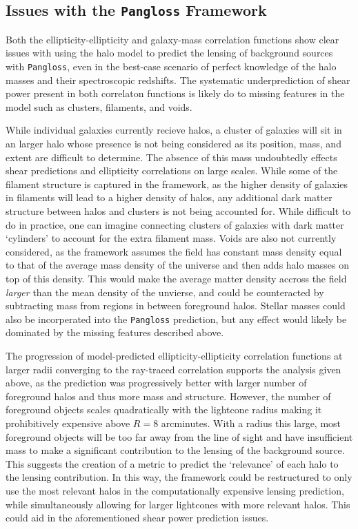 \documentclass[%
 reprint,
 amsmath,amssymb,
 aps,
]{revtex4-1}
\begin{document}
\subsection*{Issues with the \texttt{Pangloss} Framework}

Both the ellipticity-ellipticity and galaxy-mass correlation functions show clear issues with using the halo model to predict the lensing of background sources with \texttt{Pangloss}, even in the best-case scenario of perfect knowledge of the halo masses and their spectroscopic redshifts. The systematic underprediction of shear power present in both correlaton functions is likely do to missing features in the model such as clusters, filaments, and voids. 

While individual galaxies currently recieve halos, a cluster of galaxies will sit in an larger halo whose presence is not being considered as its position, mass, and extent are difficult to determine. The absence of this mass undoubtedly effects shear predictions and ellipticity correlations on large scales. While some of the filament structure is captured in the framework, as the higher density of galaxies in filaments will lead to a higher density of halos, any additional dark matter structure between halos and clusters is not being accounted for. While difficult to do in practice, one can imagine connecting clusters of galaxies with dark matter `cylinders' to account for the extra filament mass. Voids are also not currently considered, as the framework assumes the field has constant mass density equal to that of the average mass density of the universe and then adds halo masses on top of this density. This would make the average matter density accross the field \textit{larger} than the mean density of the unvierse, and could be counteracted by subtracting mass from regions in between foreground halos. Stellar masses could also be incorperated into the \texttt{Pangloss} prediction, but any effect would likely be dominated by the missing features described above.

The progression of model-predicted ellipticity-ellipticity correlation functions at larger radii converging to the ray-traced correlation supports the analysis given above, as the prediction was progressively better with larger number of foreground halos and thus more mass and structure. However, the number of foreground objects scales quadratically with the lightcone radius making it prohibitively expensive above $R=8$ arcminutes. With a radius this large, most foreground objects will be too far away from the line of sight and have insufficient mass to make a significant contribution to the lensing of the background source. This suggests the creation of a metric to predict the `relevance' of each halo to the lensing contribution. In this way, the framework could be restructured to only use the most relevant halos in the computationally expensive lensing prediction, while simultaneously allowing for larger lightcones with more relevant halos. This could aid in the aforementioned shear power prediction issues.  
\end{document}
